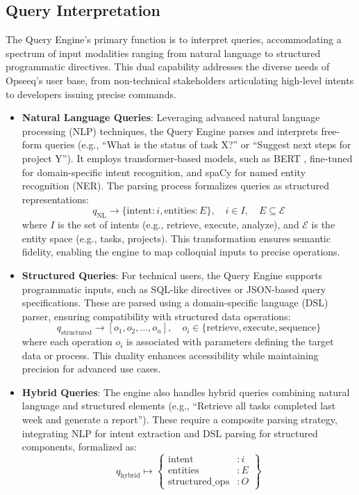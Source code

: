 \documentclass[11pt]{article}
\begin{document}
\subsection{Query Interpretation}
\label{subsec:query_interpretation}

The Query Engine’s primary function is to interpret queries, accommodating a spectrum of input modalities ranging from natural language to structured programmatic directives. This dual capability addresses the diverse needs of Opseeq’s user base, from non-technical stakeholders articulating high-level intents to developers issuing precise commands.

\begin{itemize}
    \item \textbf{Natural Language Queries}: Leveraging advanced natural language processing (NLP) techniques, the Query Engine parses and interprets free-form queries (e.g., “What is the status of task X?” or “Suggest next steps for project Y”). It employs transformer-based models, such as BERT \cite{bert}, fine-tuned for domain-specific intent recognition, and spaCy for named entity recognition (NER). The parsing process formalizes queries as structured representations:
        \[
        q_{\text{NL}} \rightarrow \{ \text{intent}: i, \text{entities}: E \}, \quad i \in I, \quad E \subseteq \mathcal{E}
        \]
        where \( I \) is the set of intents (e.g., retrieve, execute, analyze), and \( \mathcal{E} \) is the entity space (e.g., tasks, projects). This transformation ensures semantic fidelity, enabling the engine to map colloquial inputs to precise operations.

    \item \textbf{Structured Queries}: For technical users, the Query Engine supports programmatic inputs, such as SQL-like directives or JSON-based query specifications. These are parsed using a domain-specific language (DSL) parser, ensuring compatibility with structured data operations:
        \[
        q_{\text{structured}} \rightarrow [o_1, o_2, \ldots, o_n], \quad o_i \in \{\text{retrieve}, \text{execute}, \text{sequence}\}
        \]
        where each operation \( o_i \) is associated with parameters defining the target data or process. This duality enhances accessibility while maintaining precision for advanced use cases.

    \item \textbf{Hybrid Queries}: The engine also handles hybrid queries combining natural language and structured elements (e.g., “Retrieve all tasks completed last week and generate a report”). These require a composite parsing strategy, integrating NLP for intent extraction and DSL parsing for structured components, formalized as:
        \[
            q_{\text{hybrid}} \mapsto \left\{ 
            \begin{array}{ll}
            \text{intent} & : i \\
            \text{entities} & : E \\
            \text{structured\_ops} & : O
            \end{array}
            \right\}
        \]


\end{itemize}
\end{document}
